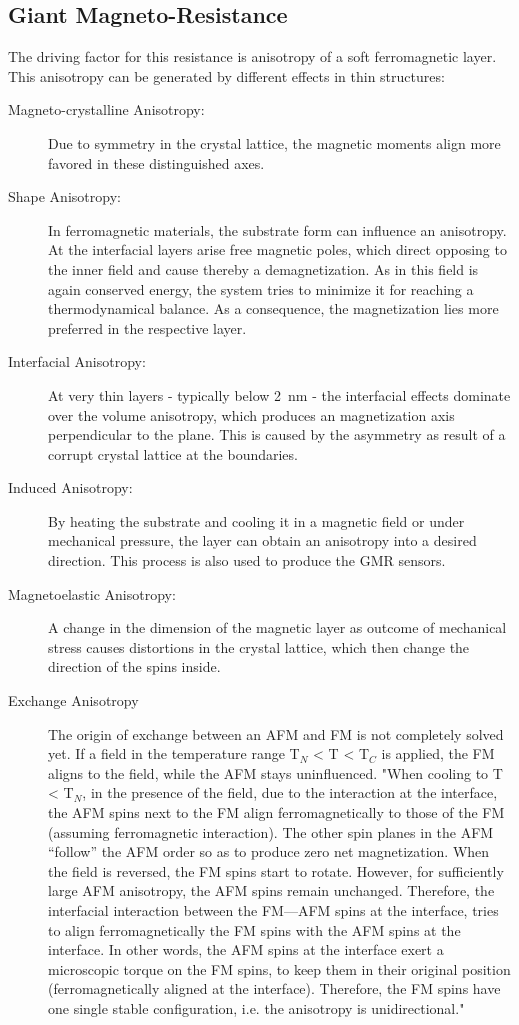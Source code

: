 \subsection{Giant Magneto-Resistance}
The driving factor for this resistance is anisotropy of a soft ferromagnetic layer. This anisotropy can be generated by different effects in thin structures:
\begin{description}
	\item[Magneto-crystalline Anisotropy:] Due to symmetry in the crystal lattice, the magnetic moments align more favored in these distinguished axes.
	\item[Shape Anisotropy:] In ferromagnetic materials, the substrate form can influence an anisotropy. At the interfacial layers arise free magnetic poles, which direct opposing to the inner field and cause thereby a demagnetization. As in this field is again conserved energy, the system tries to minimize it for reaching a thermodynamical balance. As a consequence, the magnetization lies more preferred in the respective layer.
	\item[Interfacial Anisotropy:] At very thin layers - typically below \SI{2}{\nm} - the interfacial effects dominate over the volume anisotropy, which produces an magnetization axis perpendicular to the plane. This is caused by the asymmetry as result of a corrupt crystal lattice at the boundaries.
	\item[Induced Anisotropy:] By heating the substrate and cooling it in a magnetic field or under mechanical pressure, the layer can obtain an anisotropy into a desired direction. This process is also used to produce the GMR sensors.
	\item[Magnetoelastic Anisotropy:] A change in the dimension of the magnetic layer as outcome of mechanical stress causes distortions in the crystal lattice, which then change the direction of the spins inside. 
	\item[Exchange Anisotropy] The origin of exchange between an AFM and FM is not completely solved yet. If a field in the temperature range T$_N$ < T < T$_C$ is applied, the FM aligns to the field, while the AFM stays uninfluenced. "When cooling to T < T$_N$, in the presence of the	field, due to the interaction at the interface, the	AFM spins next to the FM align ferromagnetically to those of the FM (assuming ferromagnetic interaction). The other spin planes in the AFM “follow” the AFM order so as to produce zero net magnetization. When the field is reversed, the FM spins start to rotate. However, for sufficiently large AFM anisotropy, the AFM spins remain unchanged. Therefore, the interfacial interaction
	between the FM—AFM spins at the	interface, tries to align ferromagnetically the FM
	spins with the AFM spins at the interface. In other	words, the AFM spins at the interface exert a microscopic torque on the FM spins, to keep	them in their original position (ferromagnetically aligned at the interface). Therefore, the FM spins have one single stable configuration, i.e.	the anisotropy is unidirectional."\cite{lit:nano:exchange_bias}\cite{lit:nano:austauschanistropie}
\end{description}
